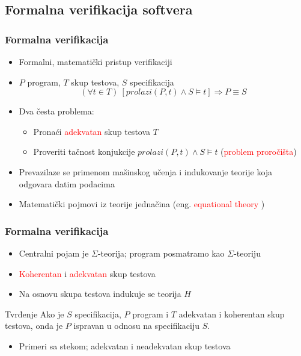 \documentclass[11pt]{beamer}
\theoremstyle{definition}
\begin{document}
\subsection{Formalna verifikacija softvera}
\label{subsec:formalna-verifikacija}
\begin{frame}
\frametitle{Formalna verifikacija}
\begin{itemize}
\item Formalni, matematički pristup verifikaciji \cite{verify}
\item $P$ program, $T$ skup testova, $S$ specifikacija
$$(\forall t\in T)\ [prolazi(P,t)\wedge S\models t]\Rightarrow P\equiv S$$
\item Dva česta problema:
	\begin{itemize}
	\item Pronaći \textcolor{red}{adekvatan} skup testova $T$
	\item Proveriti tačnost konjukcije $prolazi(P,t)\wedge S\models t$ (\textcolor{red}{problem proročišta})
	\end{itemize}
\item Prevazilaze se primenom mašinskog učenja i indukovanje teorije koja odgovara datim podacima
\item Matematički pojmovi iz teorije jednačina (eng. \textcolor{red}{equational theory} \cite{equationaltheory})
\end{itemize}
\end{frame}

\begin{frame}
\frametitle{Formalna verifikacija}
\begin{itemize}
\item Centralni pojam je $\Sigma$-teorija; program posmatramo kao $\Sigma$-teoriju
\item \textcolor{red}{Koherentan} i \textcolor{red}{adekvatan} skup testova
\item Na osnovu skupa testova indukuje se teorija $H$
\end{itemize}

\begin{block}{Tvrđenje}
Ako je $S$ specifikacija, $P$ program i $T$ adekvatan i koherentan skup testova, onda je $P$ ispravan u odnosu na specifikaciju $S$.
\end{block}

\begin{itemize}
\item Primeri sa stekom; adekvatan i neadekvatan skup testova
\end{itemize}
\end{frame}
\end{document}

